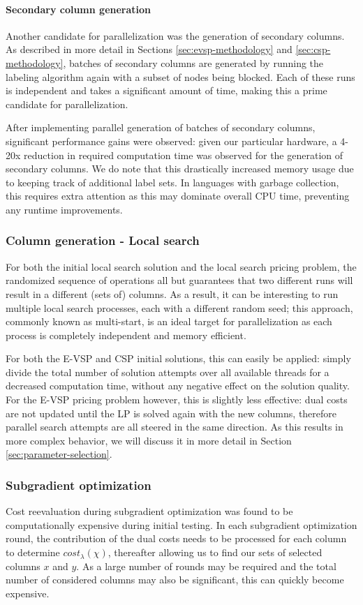 \documentclass[]{article}
\begin{document}
\paragraph{Secondary column generation}
Another candidate for parallelization was the generation of secondary columns. As described in more detail in Sections \ref{sec:evsp-methodology} and \ref{sec:csp-methodology}, batches of secondary columns are generated by running the labeling algorithm again with a subset of nodes being blocked. Each of these runs is independent and takes a significant amount of time, making this a prime candidate for parallelization.

After implementing parallel generation of batches of secondary columns, significant performance gains were observed: given our particular hardware, a 4-20x reduction in required computation time was observed for the generation of secondary columns. We do note that this drastically increased memory usage due to keeping track of additional label sets. In languages with garbage collection, this requires extra attention as this may dominate overall CPU time, preventing any runtime improvements.

\subsubsection{Column generation - Local search}
For both the initial local search solution and the local search pricing problem, the randomized sequence of operations all but guarantees that two different runs will result in a different (sets of) columns. As a result, it can be interesting to run multiple local search processes, each with a different random seed; this approach, commonly known as multi-start, is an ideal target for parallelization as each process is completely independent and memory efficient. 

For both the E-VSP and CSP initial solutions, this can easily be applied: simply divide the total number of solution attempts over all available threads for a decreased computation time, without any negative effect on the solution quality. For the E-VSP pricing problem however, this is slightly less effective: dual costs are not updated until the LP is solved again with the new columns, therefore parallel search attempts are all steered in the same direction. As this results in more complex behavior, we will discuss it in more detail in Section \ref{sec:parameter-selection}. 

\subsubsection{Subgradient optimization}
Cost reevaluation during subgradient optimization was found to be computationally expensive during initial testing. In each subgradient optimization round, the contribution of the dual costs needs to be processed for each column to determine $cost_\lambda(\chi)$, thereafter allowing us to find our sets of selected columns $x$ and $y$. As a large number of rounds may be required and the total number of considered columns may also be significant, this can quickly become expensive.
\end{document}
